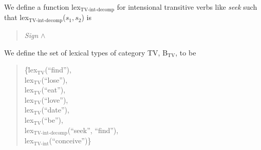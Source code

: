 We define a function lex$_{\mathrm{TV}\textrm{-}\mathrm{int}\textrm{-}\mathrm{decomp}}$ for intensional transitive verbs like
\textit{seek} such that
lex$_{\mathrm{TV}\textrm{-}\mathrm{int}\textrm{-}\mathrm{decomp}}$($s_1,s_2$) is
\begin{quote}
\hspace*{-12em}\textit{Sign} \d{$\wedge$} \\
\hspace*{-12em}

\end{quote} 

We define the set of lexical types of category TV,
B$_{\mathrm{TV}}$, to be
\begin{quote}
\begin{tabbing}
\{\=lex$_{\mathrm{TV}}$(``find''), \\
  \>lex$_{\mathrm{TV}}$(``lose''), \\
  \>lex$_{\mathrm{TV}}$(``eat''), \\
  \>lex$_{\mathrm{TV}}$(``love''), \\
  \>lex$_{\mathrm{TV}}$(``date''), \\
  \>lex$_{\mathrm{TV}}$(``be''), \\
  \>lex$_{\mathrm{TV}\textrm{-}\mathrm{int}\textrm{-}\mathrm{decomp}}$(``seek'',
  ``find''), \\
  \>lex$_{\mathrm{TV}\textrm{-}\mathrm{int}}$(``conceive'')\}
\end{tabbing}
\end{quote}

